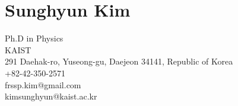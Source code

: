 \hypertarget{sunghyun-kim}{%
\section{Sunghyun Kim}\label{sunghyun-kim}}

Ph.D in Physics\\
KAIST\\
291 Daehak-ro, Yuseong-gu, Daejeon 34141, Republic of Korea\\
+82-42-350-2571\\
frssp.kim@gmail.com\\
kimsunghyun@kaist.ac.kr
